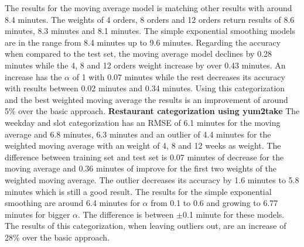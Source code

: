 The results for the moving average model is matching other results with around 8.4 minutes. The weights of 4 orders, 8 orders and 12 orders return  results of 8.6 minutes, 8.3 minutes and 8.1 minutes. The simple exponential smoothing models are in the range from 8.4 minutes up to 9.6 minutes. Regarding the accuracy when compared to the test set, the moving average model declines by 0.28 minutes while the 4, 8 and 12 orders weight increase by over 0.43 minutes. An increase has the $\alpha$ of 1 with 0.07 minutes while the rest decreases its accuracy with results between 0.02 minutes and 0.34 minutes.\newline
Using this categorization and the best weighted moving average the results is an improvement of around 5\% over the basic approach.
\newline\newline\textbf{Restaurant categorization using yum2take}\newline
The weekday and slot categorization has an RMSE of 6.1 minutes for the moving average and 6.8 minutes, 6.3 minutes and an outlier of 4.4 minutes for the weighted moving average with an weight of 4, 8 and 12 weeks as weight. The difference between training set and test set is 0.07 minutes of decrease for the moving average and 0.36 minutes of improve for the first two weights of the weighted moving average. The outlier decreases its accuracy by 1.6 minutes to 5.8 minutes which is still a good result. The results for the simple exponential smoothing are around 6.4 minutes for $\alpha$ from 0.1 to 0.6 and growing to 6.77 minutes for bigger $\alpha$. The difference is between $\pm$0.1 minute for these models.\newline
The results of this categorization, when leaving outliers out, are an increase of 28\% over the basic approach.
